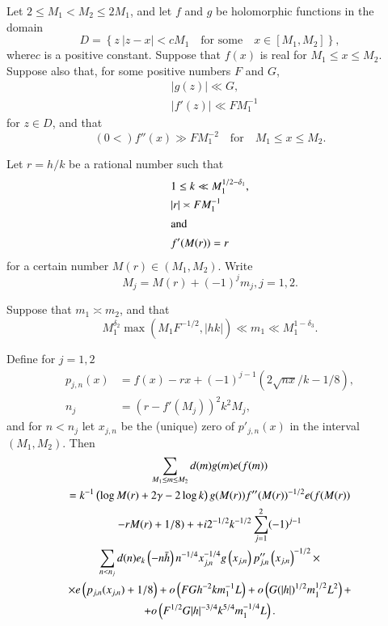 \begin{thm}\label{chap3:thm3.1}
Let $2\leq M_1<M_2\leq 2M_1$, and let $f$ and $g$ be holomorphic
functions in the domain
\begin{equation}\label{chap3:eq3.1.1}
D=\left\{z~ |z-x|<cM_1\quad\text{for some}\quad x\in[M_1,
M_2]\right\},
\end{equation}
where\pageoriginale $c$ is a positive constant. Suppose that $f(x)$ is
real for $M_1\leq x\leq M_2$. Suppose also that, for some positive
numbers $F$ and $G$,
\begin{align}
& |g(z)|\ll G,\label{chap3:eq3.1.2}\\
& |f'(z)|\ll FM_1^{-1}\label{chap3:eq3.1.3}
\end{align}
for $z\in D$, and that 
\begin{equation}\label{chap3:eq3.1.4}
(0<)f''(x)\gg FM_1^{-2}\quad\text{for}\quad M_1\leq x\leq M_2.
\end{equation}

Let $r=h/k$ be a rational number such that 
\begin{align}
& 1\leq k\ll M_1^{1/2-\delta_1},\label{chap3:eq3.1.5}\\
& |r|\asymp FM_1^{-1}\label{chap3:eq3.1.6}\\
\intertext{and}
& f'(M(r))=r\label{chap3:eq3.1.7}
\end{align}
for a certain number $M(r)\in(M_1,M_2)$. Write 
$$
M_j=M(r)+(-1)^jm_j,j=1,2.
$$

Suppose that $m_1\asymp m_2$, and that 
\begin{equation}\label{chap3:eq3.1.8}
M_1^{\delta_2}\max\left(M_1F^{-1/2},|hk|\right)\ll m_1\ll
M_1^{1-\delta_3}. 
\end{equation}

Define for $j=1,2$
\begin{align}
p_{j,n}(x) &= f(x)-rx+(-1)^{j-1}\left(2\sqrt{nx}/k-1/8
\right),\label{chap3:eq3.1.9}\\
n_j &= \left(r-f'\left(M_j\right)\right)^2k^2
M_j,\label{chap3:eq3.1.10} 
\end{align}
and for $n<n_j$ let $x_{j,n}$ be the (unique) zero of $p'_{j,n}(x)$ in
the interval $(M_1,M_2)$. Then 
\begin{gather}
\sum\limits_{M_1\leq m\leq M_2}d(m)g(m)e(f(m))\label{chap3:eq3.1.11}\\
=k^{-1}\left(\log M(r)+2\gamma-2\log k\right)g(M(r))f''(M(r))^{-1/2}
e(f(M(r))\notag\\
-rM(r)+1/8)+ +i2^{-1/2}k^{-1/2}\sum\limits_{j=1}^2(-1)^{j-1}\notag\\
\sum\limits_{n<n_j}d(n)
e_k\left(-n\bar{h}\right)n^{-1/4}x_{j,n}^{-1/4}g\left(x_{j,n}\right)
p''_{j,n}\left(x_{j,n}\right)^{-1/2}\times\notag\\
\times e\left(p_{j,n}(x_{j,n})+1/8\right)+o\left(FGh^{-2}km_1^{-1}L
\right)+o\left(G(|h|)^{1/2}m_1^{1/2}L^2\right)+\notag\\
+o\left(F^{1/2}G|h|^{-3/4}k^{5/4}m_1^{-1/4}L\right).\notag
\end{gather}\pageoriginale
\end{thm}

